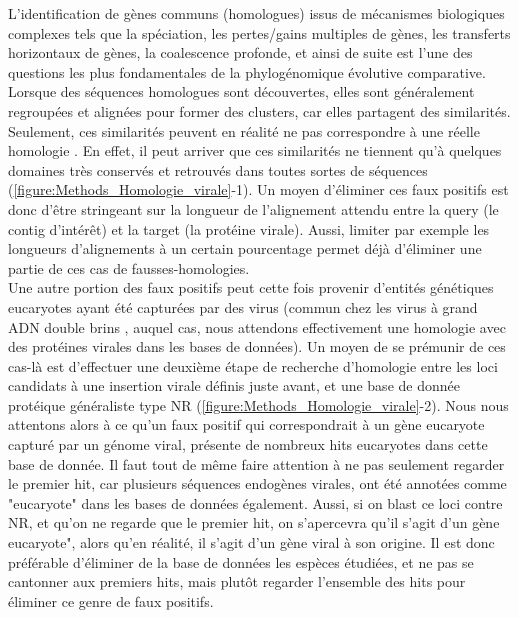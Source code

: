L'identification de gènes communs (homologues) issus de mécanismes biologiques complexes tels que la spéciation, les pertes/gains multiples de gènes, les transferts horizontaux de gènes, la coalescence profonde, et ainsi de suite \citep{koonin_orthologs_2005} est l'une des questions les plus fondamentales de la phylogénomique évolutive comparative. Lorsque des séquences homologues sont découvertes, elles sont généralement regroupées et alignées pour former des clusters, car elles partagent des similarités. Seulement, ces similarités peuvent en réalité ne pas correspondre à une réelle homologie \citep{wong_necessity_2014}. En effet, il peut arriver que ces similarités ne tiennent qu'à quelques domaines très conservés et retrouvés dans toutes sortes de séquences \citep{wong_necessity_2014}(\figurename{\ref{figure:Methods_Homologie_virale}}-1). Un moyen d'éliminer ces faux positifs est donc d'être stringeant sur la longueur de l'alignement attendu entre la query (le contig d'intérêt) et la target (la protéine virale). Aussi, limiter par exemple les longueurs d'alignements à un certain pourcentage permet déjà d'éliminer une partie de ces cas de fausses-homologies.\\
Une autre portion des faux positifs peut cette fois provenir d'entités génétiques eucaryotes ayant été capturées par des virus (commun chez les virus à grand ADN double brins \citep{irwin_systematic_2022}, auquel cas, nous attendons effectivement une homologie avec des protéines virales dans les bases de données). Un moyen de se prémunir de ces cas-là est d'effectuer une deuxième étape de recherche d'homologie entre les loci candidats à une insertion virale définis juste avant, et une base de donnée protéique généraliste type NR (\figurename{\ref{figure:Methods_Homologie_virale}}-2). Nous nous attentons alors à ce qu'un faux positif qui correspondrait à un gène eucaryote capturé par un génome viral, présente de nombreux hits eucaryotes dans cette base de donnée. Il faut tout de même faire attention à ne pas seulement regarder le premier hit, car plusieurs séquences endogènes virales, ont été annotées comme "eucaryote" dans les bases de données également. Aussi, si on blast ce loci contre NR, et qu'on ne regarde que le premier hit, on s'apercevra qu'il s'agit d'un gène eucaryote", alors qu'en réalité, il s'agit d'un gène viral à son origine. Il est donc préférable d'éliminer de la base de données les espèces étudiées, et ne pas se cantonner aux premiers hits, mais plutôt regarder l'ensemble des hits pour éliminer ce genre de faux positifs. 

